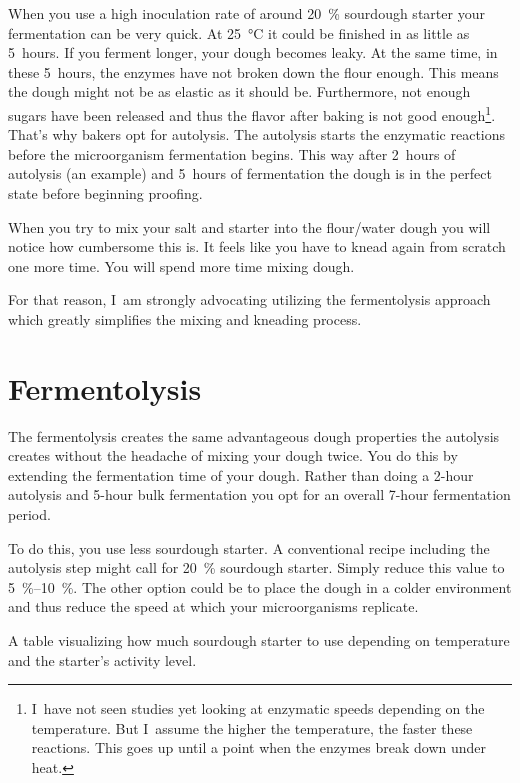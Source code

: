 When you use a high inoculation rate of around \qty{20}{\percent} sourdough starter
your fermentation can be very quick. At \qty{25}{\degreeCelsius} it could be finished in as little as 5~hours.
If you ferment longer, your dough becomes leaky. At the same time, in
these 5~hours, the enzymes have not broken down the flour enough. This means
the dough might not be as elastic as it should be. Furthermore, not enough
sugars have been released and thus the flavor after baking is not good
enough\footnote{I~have not seen studies yet looking at enzymatic speeds depending on
the temperature. But I~assume the higher the temperature, the faster these
reactions. This goes up until a point when the enzymes break down under
heat.}. That's why bakers opt for autolysis. The autolysis starts the enzymatic
reactions before the microorganism fermentation begins. This way after 2~hours
of autolysis (an example) and 5~hours of fermentation the dough is in the
perfect state before beginning proofing.

When you try to mix your salt and starter into the flour/water dough you will
notice how cumbersome this is. It feels like you have to knead again from scratch
one more time. You will spend more time mixing dough.

For that reason, I~am strongly advocating utilizing the fermentolysis approach
which greatly simplifies the mixing and kneading process.

\section{Fermentolysis}%
\label{section:fermentolysis}

The fermentolysis creates the same advantageous dough properties the
autolysis creates without the headache of mixing your dough twice. You do this
by extending the fermentation time of your dough. Rather than doing a 2-hour
autolysis and 5-hour bulk fermentation you opt for an overall 7-hour
fermentation period.

To do this, you use less sourdough starter. A conventional recipe including the
autolysis step might call for \qty{20}{\percent} sourdough starter. Simply reduce this
value to \qtyrange{5}{10}{\percent}. The other option could be to place the dough in a colder
environment and thus reduce the speed at which your microorganisms replicate.

\begin{table}[!htb]
    \begin{center}
        
        \caption[Quantity of sourdough]{A table visualizing how much sourdough
            starter to use depending on temperature and the starter's activity
            level.}
    \end{center}
\end{table}

